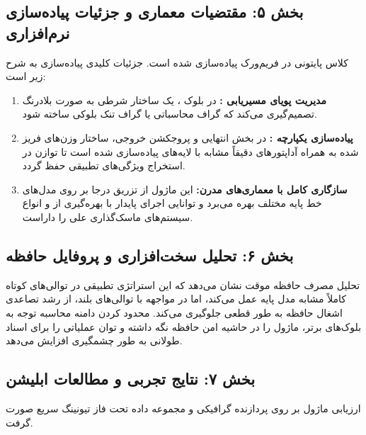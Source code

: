 \subsection*{بخش ۵: مقتضیات معماری و جزئیات پیاده‌سازی نرم‌افزاری }
کلاس پایتونی  در فریم‌ورک  پیاده‌سازی شده است. جزئیات کلیدی پیاده‌سازی به شرح زیر است:

\begin{enumerate}
    \item \textbf{مدیریت پویای مسیریابی :} در بلوک ، یک ساختار شرطی  به صورت بلادرنگ تصمیم‌گیری می‌کند که گراف محاسباتی  یا گراف تنک بلوکی ساخته شود.
    \item \textbf{پیاده‌سازی یکپارچه :} در بخش انتهایی و پروجکشن خروجی، ساختار وزن‌های فریز شده به همراه آداپتورهای  دقیقاً مشابه با لایه‌های  پیاده‌سازی شده است تا توازن در استخراج ویژگی‌های تطبیقی حفظ گردد.
    \item \textbf{سازگاری کامل با معماری‌های مدرن:} این ماژول از تزریق درجا  بر روی مدل‌های خط پایه مختلف بهره می‌برد و توانایی اجرای پایدار با بهره‌گیری از  و انواع سیستم‌های ماسک‌گذاری علی را داراست.
\end{enumerate}

\subsection*{بخش ۶: تحلیل سخت‌افزاری و پروفایل حافظه }
تحلیل مصرف حافظه موقت نشان می‌دهد که این استراتژی تطبیقی در توالی‌های کوتاه کاملاً مشابه مدل پایه عمل می‌کند، اما در مواجهه با توالی‌های بلند، از رشد تصاعدی اشغال حافظه  به طور قطعی جلوگیری می‌کند. محدود کردن دامنه محاسبه توجه به بلوک‌های برتر، ماژول را در حاشیه امن حافظه  نگه داشته و توان عملیاتی  را برای اسناد طولانی به طور چشمگیری افزایش می‌دهد.

\subsection*{بخش ۷: نتایج تجربی و مطالعات ابلیشن }
ارزیابی ماژول  بر روی پردازنده گرافیکی  و مجموعه داده  تحت فاز تیونینگ سریع  صورت گرفت.

